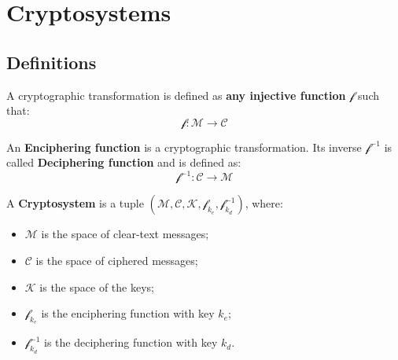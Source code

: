\section{Cryptosystems}
\subsection{Definitions}
\begin{definition}
    A cryptographic transformation is defined as \textbf{any injective function} $\mathscr{f}$ such that:
    \[\mathscr{f}: \mathcal{M} \rightarrow \mathcal{C}\]
\end{definition}
\begin{definition}
    An \textbf{Enciphering function} is a cryptographic transformation. Its inverse $\mathscr{f}^{-1}$ is called \textbf{Deciphering function} and is defined as:
    \[\mathscr{f}^{-1}: \mathcal{C} \rightarrow \mathcal{M}\]
\end{definition}
\begin{definition}[Cryptosystem]
    A \textbf{Cryptosystem} is a tuple $(\mathcal{M},\mathcal{C}, \mathcal{K}, \mathscr{f}_{k_{e}},\mathscr{f}_{k_{d}}^{-1})$, where:
    \begin{itemize}
        \item $\mathcal{M}$ is the space of clear-text messages;
        \item $\mathcal{C}$ is the space of ciphered messages;
        \item $\mathcal{K}$ is the space of the keys;
        \item $\mathscr{f}_{k_e}$ is the enciphering function with key $k_{e}$;
        \item $\mathscr{f}_{k_d}^{-1}$ is the deciphering function with key $k_{d}$.
    \end{itemize}
\end{definition}
